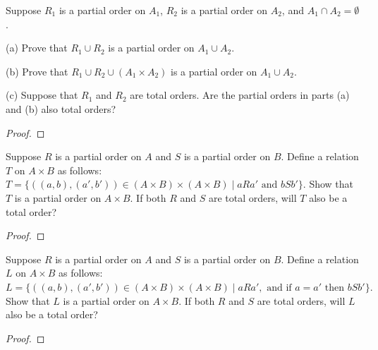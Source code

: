 \documentclass[12pt]{article}
\newenvironment{exercise}[2][Exercise]{\begin{trivlist}
\item[\hskip \labelsep {\bfseries #1}\hskip \labelsep {\bfseries #2.}]}{\end{trivlist}}
\begin{document}
\begin{exercise}
	{7}
	Suppose \( R_1 \) is a partial order on \( A_1 \), \( R_2 \) is a partial order on \( A_2 \), and \( A_1 \cap A_2 = \emptyset \).

(a) Prove that \( R_1 \cup R_2 \) is a partial order on \( A_1 \cup A_2 \).

(b) Prove that \( R_1 \cup R_2 \cup (A_1 \times A_2) \) is a partial order on \( A_1 \cup A_2 \).

(c) Suppose that \( R_1 \) and \( R_2 \) are total orders. Are the partial orders in parts (a) and (b) also total orders?
\end{exercise}

\begin{proof}
	
\end{proof}

\begin{exercise}
	{8}
	Suppose \( R \) is a partial order on \( A \) and \( S \) is a partial order on \( B \). Define a relation \( T \) on \( A \times B \) as follows:
$T = \{((a, b), (a', b')) \in (A \times B) \times (A \times B) \mid a R a' \text{ and } b S b' \}.$
Show that \( T \) is a partial order on \( A \times B \). If both \( R \) and \( S \) are total orders, will \( T \) also be a total order?
\end{exercise}

\begin{proof}
	
\end{proof}

\begin{exercise}
	{9}
	Suppose \( R \) is a partial order on \( A \) and \( S \) is a partial order on \( B \). Define a relation \( L \) on \( A \times B \) as follows:
$
L = \{((a, b), (a', b')) \in (A \times B) \times (A \times B) \mid a R a', \text{ and if } a = a' \text{ then } b S b' \}.
$
Show that \( L \) is a partial order on \( A \times B \). If both \( R \) and \( S \) are total orders, will \( L \) also be a total order?
\end{exercise}

\begin{proof}
	
\end{proof}
























\end{document}
